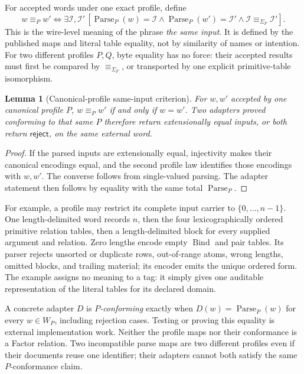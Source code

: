 \documentclass[11pt,twoside]{article}
\newtheorem{lemma}[theorem]{Lemma}
\begin{document}
For accepted words under one exact profile, define
\[
 w\equiv_P w'
 \Longleftrightarrow
 \exists\mathcal I,\mathcal I'\,
 [\operatorname{Parse}_P(w)=\mathcal I
  \land\operatorname{Parse}_P(w')=\mathcal I'
  \land\mathcal I\equiv_{\Sigma_F}\mathcal I'].
\]
This is the wire-level meaning of the phrase \emph{the same input}.  It is
defined by the published maps and literal table equality, not by similarity of
names or intention.  For two different profiles \(P,Q\), byte equality has no
force: their accepted results must first be compared by
\(\equiv_{\Sigma_F}\), or transported by one explicit primitive-table
isomorphism.

\begin{lemma}[Canonical-profile same-input criterion]\label{lem:profile}
For \(w,w'\) accepted by one canonical profile \(P\),
\(w\equiv_P w'\) if and only if \(w=w'\).  Two adapters proved conforming to that
same \(P\) therefore return extensionally equal inputs, or both return
\(\mathsf{reject}\), on the same external word.
\end{lemma}

\begin{proof}
If the parsed inputs are extensionally equal, injectivity makes their canonical
encodings equal, and the second profile law identifies those encodings with
\(w,w'\).  The converse follows from single-valued parsing.  The adapter statement
then follows by equality with the same total \(\operatorname{Parse}_P\).
\end{proof}

For example, a profile may restrict its complete input carrier to
\(\{0,\ldots,n-1\}\).  One length-delimited word records \(n\), then the four
lexicographically ordered primitive relation tables, then a length-delimited block
for every supplied argument and relation.  Zero lengths encode empty
\(\operatorname{Bind}\) and pair tables.  Its parser rejects unsorted or duplicate
rows, out-of-range atoms, wrong lengths, omitted blocks, and trailing material;
its encoder emits the unique ordered form.  The example assigns no meaning to a
tag: it simply gives one auditable representation of the literal tables for its
declared domain.

A concrete adapter \(D\) is \emph{\(P\)-conforming} exactly when
\(D(w)=\operatorname{Parse}_P(w)\) for every \(w\in W_P\), including rejection
cases.  Testing or proving this equality is external implementation work.  Neither
the profile maps nor their conformance is a Factor relation.  Two incompatible
parse maps are two different profiles even if their documents reuse one identifier;
their adapters cannot both satisfy the same \(P\)-conformance claim.
\end{document}
